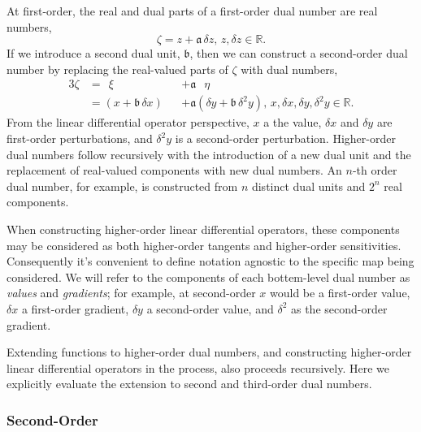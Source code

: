 At first-order, the real and dual parts of a first-order dual number are real numbers,
%
\begin{equation*}
\zeta = z + \mathfrak{a} \, \delta z, \, z, \delta z \in \mathbb{R}.
\end{equation*}
%
If we introduce a second dual unit, $\mathfrak{b}$, then we can construct a second-order 
dual number by replacing the real-valued parts of $\zeta$ with dual numbers,
%
\begin{alignat*}{3}
\zeta
&=
\;\, \xi
&&+ \mathfrak{a} \;\;\, \eta
\\
&=
\left( x + \mathfrak{b} \, \delta x \right)
&&+ \mathfrak{a} \left( \delta y + \mathfrak{b} \, \delta^{2} y \right), 
\, x, \delta x, \delta y, \delta^{2} y \in \mathbb{R}.
\end{alignat*}
%
From the linear differential operator perspective, $x$ a the value, $\delta x$ and 
$\delta y$ are first-order perturbations, and $\delta^{2} y$ is a second-order perturbation.
Higher-order dual numbers follow recursively with the introduction of a new dual unit
and the replacement of real-valued components with new dual numbers.  An $n$-th 
order dual number, for example, is constructed from $n$ distinct dual units and
$2^{n}$ real components.

When constructing higher-order linear differential operators, these components may 
be considered as both higher-order tangents and higher-order sensitivities. Consequently 
it's convenient to define notation agnostic to the specific map being considered.
We will refer to the components of each bottem-level dual number as \textit{values} and
\textit{gradients}; for example, at second-order $x$ would be a first-order value, $\delta x$ 
a first-order gradient, $\delta y$ a second-order value, and $\delta^{2}$ as the second-order 
gradient.

Extending functions to higher-order dual numbers, and constructing higher-order
linear differential operators in the process, also proceeds recursively.  Here we
explicitly evaluate the extension to second and third-order dual numbers.

\subsubsection{Second-Order}

